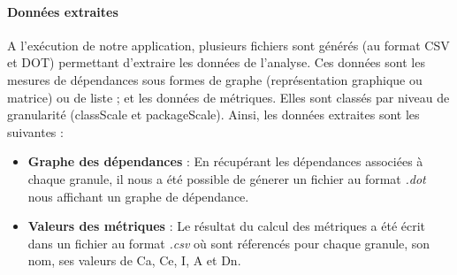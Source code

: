 \documentclass{scrartcl}
\begin{document}
    \paragraph{Données extraites}A l'exécution de notre application, plusieurs fichiers sont générés (au format CSV et DOT) permettant d'extraire les données de l'analyse. Ces données sont les mesures de dépendances sous formes de graphe (représentation graphique ou matrice) ou de liste ; et les données de métriques. Elles sont classés par niveau de granularité (classScale et packageScale). Ainsi, les données extraites sont les suivantes :
    \begin{itemize}
        \item \textbf{Graphe des dépendances} : En récupérant les dépendances associées à chaque granule, il nous a été possible de génerer un fichier au format \emph{.dot} nous affichant un graphe de dépendance. 
        \item \textbf{Valeurs des métriques} : Le résultat du calcul des métriques a été écrit dans un fichier au format \emph{.csv} où sont réferencés pour chaque granule, son nom, ses valeurs de Ca, Ce, I, A et Dn.
    \end{itemize}
\end{document}
